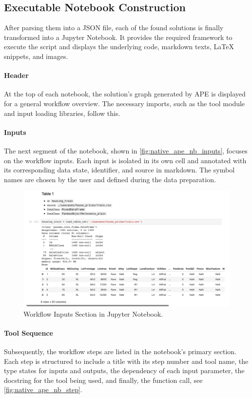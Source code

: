 \subsection{Executable Notebook Construction}
After parsing them into a JSON file, each of the found solutions is finally transformed into a Jupyter Notebook. It provides the required framework to execute the script and displays the underlying code, markdown texts, LaTeX snippets, and images.

\paragraph{Header}
At the top of each notebook, the solution's graph generated by APE is displayed for a general workflow overview. The necessary imports, such as the tool module and input loading libraries, follow this.

\paragraph{Inputs}
The next segment of the notebook, shown in \autoref{fig:native_ape_nb_inputs}, focuses on the workflow inputs. Each input is isolated in its own cell and annotated with its corresponding data state, identifier, and source in markdown. The symbol names are chosen by the user and defined during the data preparation.

\begin{figure}
    \centering
    \includegraphics[width=\textwidth]{Tex/images/native_ape_nb_inputs.png}
    \caption{Workflow Inputs Section in Jupyter Notebook.}
    \label{fig:native_ape_nb_inputs}
\end{figure}

\paragraph{Tool Sequence}
Subsequently, the workflow steps are listed in the notebook’s primary section. Each step is structured to include a title with its step number and tool name, the type states for inputs and outputs, the dependency of each input parameter, the docstring for the tool being used, and finally, the function call, see \autoref{fig:native_ape_nb_step}.

